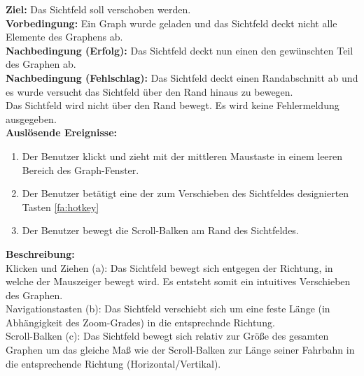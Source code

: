 \label{fa:verschieben}
\textbf{Ziel:} Das Sichtfeld soll verschoben werden.\\
\textbf{Vorbedingung:} Ein Graph wurde geladen und das Sichtfeld deckt nicht alle Elemente des Graphens ab.\\
\textbf{Nachbedingung (Erfolg):}  Das Sichtfeld deckt nun einen den gewünschten Teil des Graphen ab.\\
\textbf{Nachbedingung (Fehlschlag):} Das Sichtfeld deckt einen Randabschnitt ab und es wurde versucht das Sichtfeld über den Rand hinaus zu bewegen.\\
Das Sichtfeld wird nicht über den Rand bewegt. Es wird keine Fehlermeldung ausgegeben.\\
\textbf{Auslösende Ereignisse:}
\begin{enumerate}[nolistsep, label=(\alph*)]
  \item Der Benutzer klickt und zieht mit der mittleren Maustaste in einem leeren Bereich des Graph-Fenster.
  \item Der Benutzer betätigt eine der zum Verschieben des Sichtfeldes designierten Tasten \ref{fa:hotkey}
  \item Der Benutzer bewegt die Scroll-Balken am Rand des Sichtfeldes. %
\end{enumerate}
\textbf{Beschreibung:}\\
Klicken und Ziehen (a): Das Sichtfeld bewegt sich entgegen der Richtung, in welche der Mauszeiger bewegt wird. Es entsteht somit ein intuitives Verschieben des Graphen.\\
Navigationstasten (b): Das Sichtfeld verschiebt sich um eine feste Länge (in Abhängigkeit des Zoom-Grades) in die entsprechnde Richtung.\\
Scroll-Balken (c): Das Sichtfeld bewegt sich relativ zur Größe des gesamten Graphen um das gleiche Maß wie der Scroll-Balken zur Länge seiner Fahrbahn in die entsprechende Richtung (Horizontal/Vertikal).\\

